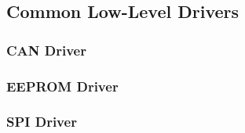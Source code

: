 
\subsection{Common Low-Level Drivers}

\subsubsection{CAN Driver}

\subsubsection{EEPROM Driver}

\subsubsection{SPI Driver}
